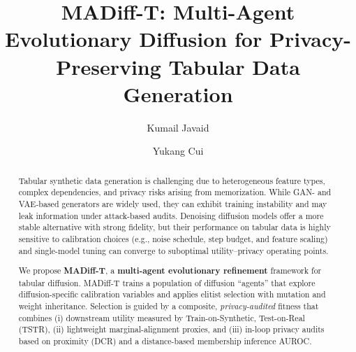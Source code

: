 \documentclass[preprint,12pt]{elsarticle}
\begin{document}

\begin{frontmatter}

\title{MADiff-T: Multi-Agent Evolutionary Diffusion for Privacy-Preserving Tabular Data Generation}



\author[aff1]{Kumail Javaid}
\author[aff1]{Yukang Cui}


\address[aff1]{College of Mechatronics and Control Engineering, Shenzhen University, Shenzhen, China}

\begin{abstract}
Tabular synthetic data generation is challenging due to heterogeneous feature types, complex dependencies, and privacy risks arising from memorization. While GAN- and VAE-based generators are widely used, they can exhibit training instability and may leak information under attack-based audits. Denoising diffusion models offer a more stable alternative with strong fidelity, but their performance on tabular data is highly sensitive to calibration choices (e.g., noise schedule, step budget, and feature scaling) and single-model tuning can converge to suboptimal utility--privacy operating points.

We propose \textbf{MADiff-T}, a \textbf{multi-agent evolutionary refinement} framework for tabular diffusion. MADiff-T trains a population of diffusion ``agents'' that explore diffusion-specific calibration variables and applies elitist selection with mutation and weight inheritance. Selection is guided by a composite, \emph{privacy-audited} fitness that combines (i) downstream utility measured by Train-on-Synthetic, Test-on-Real (TSTR), (ii) lightweight marginal-alignment proxies, and (iii) in-loop privacy audits based on proximity (DCR) and a distance-based membership inference AUROC.


\end{abstract}
\end{frontmatter}
\end{document}
